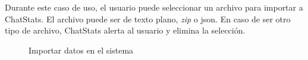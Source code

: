 Durante este caso de uso, el usuario puede seleccionar un archivo para importar a ChatStats. El archivo puede ser de texto plano, \textit{zip} o \acrshort{json}. En caso de ser otro tipo de archivo, ChatStats alerta al usuario y elimina la selección.

\begin{figure}[H]
	\centering
	\qquad
	\qquad
	\caption{Importar datos en el sistema}
	\label{fig:chap5:import}
\end{figure}


